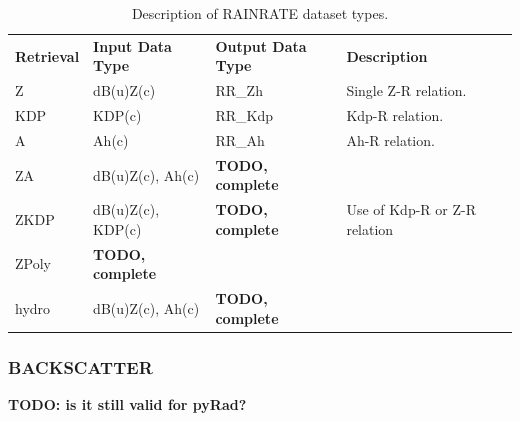 \documentclass[a4paper,11pt,pdftex,twoside]{scrartcl}
\renewcommand{\bf}{\normalfont \bfseries}
\begin{document}
{{{\begin{table}[H]
\begin{tabularx}{\textwidth}{lllX}
\bf{Retrieval}  & \bf{Input Data Type}    & \bf{Output Data Type}  & \bf{Description}\\
Z               & dB(u)Z(c)               & RR\_Zh                 & Single Z-R relation.\\
KDP             & KDP(c)                  & RR\_Kdp                & Kdp-R relation.\\
A               & Ah(c)                      & RR\_Ah                 & Ah-R relation.\\
ZA              &         dB(u)Z(c), Ah(c)             &   {\bf TODO, complete}                &  \\
ZKDP            &         dB(u)Z(c), KDP(c)            &  {\bf TODO, complete}  & Use of Kdp-R or Z-R relation  \\
ZPoly           &         {\bf TODO, complete}         &                  &  \\
hydro           &         dB(u)Z(c), Ah(c)             &   {\bf TODO, complete}     &  \\

\end{tabularx}
\caption{Description of RAINRATE dataset types.}
\label{tab_dataset_rainrate}
\end{table}


\subsubsection{BACKSCATTER}
\label{subsec_backscatter}

{\bf TODO: is it still valid for pyRad?}

}}}
\end{document}

